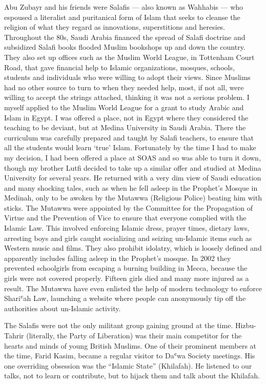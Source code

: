 \documentclass[12pt]{memoir}
\def\`{ʿ} %
\def\–{-\hskip0pt}
\begin{document}
Abu Zubayr and his friends were Salafis — also known as Wahhabis —
who espoused a literalist and puritanical form of Islam
that seeks to cleanse the religion of what they regard
as innovations, superstitions and heresies.
Throughout the 80s, Saudi Arabia financed the spread of Salafi doctrine
and subsidized Salafi books flooded Muslim bookshops up and down the country.
They also set up offices such as the Muslim World League,
in Tottenham Court Road, that gave financial help to Islamic organizations,
mosques, schools, students and individuals
who were willing to adopt their views.
Since Muslims had no other source to turn to when they needed help, most,
if not all, were willing to accept the strings attached,
thinking it was not a serious problem.
I myself applied to the Muslim World League
for a grant to study Arabic and Islam in Egypt.
I was offered a place,
not in Egypt where they considered the teaching to be deviant,
but at Medina University in Saudi Arabia.
There the curriculum was carefully prepared and taught by Salafi teachers,
to ensure that all the students would learn ‘true’ Islam.
Fortunately by the time I had to make my decision,
I had been offered a place at SOAS and so was able to turn it down,
though my brother Lutfi decided to take up a similar offer
and studied at Medina University for several years.
He returned with a very dim view of Saudi education and many shocking tales,
such as when he fell asleep in the Prophet’s Mosque in Medinah,
only to be awoken by the Mutawwa (Religious Police) beating him with sticks.
The Mutawwa were appointed by the Committee for the Propagation of Virtue
and the Prevention of Vice to ensure
that everyone complied with the Islamic Law.
This involved enforcing Islamic dress, prayer times, dietary laws,
arresting boys and girls caught socializing
and seizing un-Islamic items such as Western music and films.
They also prohibit idolatry,
which is loosely defined and apparently includes falling asleep
in the Prophet’s mosque.
In 2002 they prevented schoolgirls from escaping a burning building in Mecca,
because the girls were not covered properly.
Fifteen girls died and many more injured as a result.
The Mutawwa have even enlisted the help of modern technology
to enforce Shari\`ah Law, launching a website where people can anonymously
tip off the authorities about un\–Islamic activity.

The Salafis were not the only militant group gaining ground at the time.
Hizbu\–Tahrir (literally, the Party of Liberation)
was their main competitor for the hearts and minds of young British Muslims.
One of their prominent members at the time, Farid Kasim,
became a regular visitor to Da\`wa Society meetings.
His one overriding obsession was the “Islamic State” (Khilafah).
He listened to our talks, not to learn or contribute,
but to hijack them and talk about the Khilafah.
\end{document}
